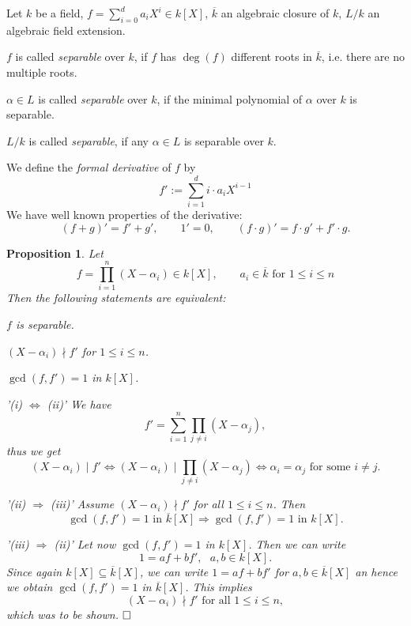 \documentclass[11pt]{book}
\newtheorem{proposition}[theorem]{Proposition}
\theoremstyle{nonumberbreak}
\newenvironment{defin}[1][]{\ifthenelse{\equal{#1}{}}{\definition}{\definition[#1]}\rm}{\enddefinition}
\newenvironment{pr}[1][]{\ifthenelse{\equal{#1}{}}{\proof}{\proof[#1]}\rm}{\endproof}
\begin{document}
\begin{spacing}{1.3}
\begin{defin} %
Let $k$ be a field, $f=\sum_{i=0}^d a_i X^{i} \in k[X]$, $\overline{k}$ an algebraic closure of $k$, $L/k$ an algebraic field extension.
\begin{compactenum}
\item $f$ is called \textit{separable} over $k$, if $f$ has $\deg(f)$ different roots in $\overline{k}$, i.e. there are no multiple roots.
\item $\alpha \in L$ is called \textit{separable} over $k$, if the minimal polynomial of $\alpha$ over $k$ is separable.
\item $L/k$ is called \textit{separable}, if any $\alpha \in L$ is separable over $k$. 
\item We define the \textit{formal derivative} of $f$ by $$f':=\sum_{i=1}^d i \cdot a_iX^{i-1}$$We have well known properties of the derivative:
$$(f+g)'=f'+g', \qquad1'=0, \qquad (f\cdot g)'=f\cdot g'+f'\cdot g.$$
\end{compactenum}
\end{defin}

\begin{proposition} %
Let $$f=\prod_{i=1}^n (X-\alpha_i) \in k[X], \qquad a_i \in \overline{k}\textrm{ for }1 \leqslant i\leqslant n$$
Then the following statements are equivalent:
\begin{compactenum}
\item $f$ is separable.
\item $(X-\alpha_i) \nmid f'$ for $1 \leqslant i \leqslant n$.
\item $\gcd(f,f')=1$ in $k[X]$.
\end{compactenum}
\begin{pr}
\begin{compactitem}
\item['(i) $\Leftrightarrow$ (ii)'] We have $$f'=\sum_{i=1}^n \prod_{j\neq i} (X-\alpha_j),$$thus we get
$$(X-\alpha_i) \mid f' \Leftrightarrow (X-\alpha_i) \mid \prod_{j\neq i} (X-\alpha_j) \Leftrightarrow \alpha_i = \alpha_j\textrm{ for some }i\neq j.$$
\item['(ii) $\Rightarrow$ (iii)'] Assume $(X-\alpha_i) \nmid f'$ for all $1\leqslant i \leqslant n$. Then $$\gcd(f,f')=1 \textrm{ in }\overline{k}[X] \Longrightarrow \gcd(f,f')=1 \textrm{ in }k[X].$$ 
\item['(iii) $\Rightarrow$ (ii)'] Let now $\gcd(f,f')=1$ in $k[X]$. Then we can write $$1=af+bf', \textrm{  }a,b \in k[X].$$Since again $k[X] \subseteq \overline{k}[X]$, we can write $1=af+bf'$ for $a,b \in \overline{k}[X]$ an hence we obtain $\gcd(f,f')=1$ in $\overline{k}[X]$. This implies $$(X-\alpha_i) \nmid f' \textrm{ for all }1 \leqslant i \leqslant n,$$
which was to be shown. $\hfill \Box$
\end{compactitem}
\end{pr}
\end{proposition}


\end{spacing}
\end{document}
